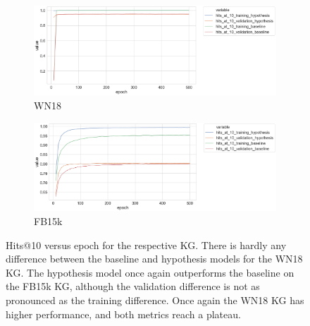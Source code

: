 
\begin{figure}[H]
	\begin{subfigure}[b]{.5\linewidth}
   		\centering
    		\includegraphics[width=1.0\linewidth, height=0.6\linewidth]{WN18_hits_at_10_Results}
		\captionsetup{justification=centering}
		\caption{WN18}
	\end{subfigure}
	\begin{subfigure}[b]{.5\linewidth}
   		\centering
		\includegraphics[width=1.0\linewidth, height=0.6\linewidth]{FB15k_hits_at_10_Results}
		\captionsetup{justification=centering}
		\caption{FB15k}
	\end{subfigure}
	\captionsetup{justification=centering}
	\caption{Hits@10 versus epoch for the respective KG. There is hardly any difference between the baseline and hypothesis models for the WN18 KG. The hypothesis model once again outperforms the baseline on the FB15k KG, although the validation difference is not as pronounced as the training difference. Once again the WN18 KG has higher performance, and both metrics reach a plateau.}
\end{figure}


